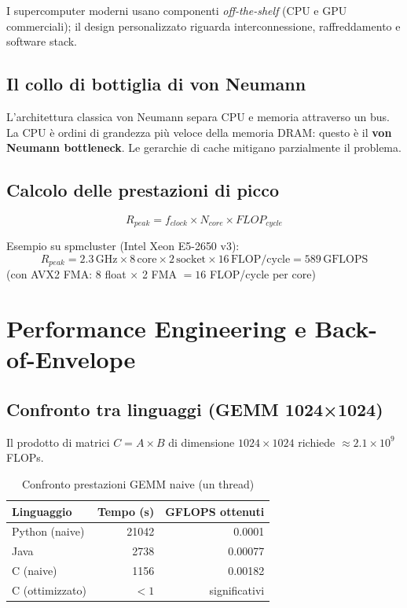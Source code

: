 \documentclass[11pt,a4paper]{article}
\theoremstyle{remark}
\begin{document}
I supercomputer moderni usano componenti \emph{off-the-shelf} (CPU e GPU commerciali); il design personalizzato riguarda interconnessione, raffreddamento e software stack.

\subsection{Il collo di bottiglia di von Neumann}

L'architettura classica von Neumann separa CPU e memoria attraverso un bus. La CPU è ordini di grandezza più veloce della memoria DRAM: questo è il \textbf{von Neumann bottleneck}. Le gerarchie di cache mitigano parzialmente il problema.

\subsection{Calcolo delle prestazioni di picco}

\begin{equation}
  R_{peak} = f_{clock} \times N_{core} \times FLOP_{cycle}
\end{equation}

Esempio su spmcluster (Intel Xeon E5-2650 v3):
\[
  R_{peak} = 2.3\,\text{GHz} \times 8\,\text{core} \times 2\,\text{socket} \times 16\,\text{FLOP/cycle} = 589\,\text{GFLOPS}
\]
(con AVX2 FMA: 8 float $\times$ 2 FMA $= 16$ FLOP/cycle per core)

\section{Performance Engineering e Back-of-Envelope}

\subsection{Confronto tra linguaggi (GEMM 1024×1024)}

Il prodotto di matrici $C = A \times B$ di dimensione $1024 \times 1024$ richiede $\approx 2.1 \times 10^9$ FLOPs.

\begin{table}[H]
\centering
\begin{tabular}{lrr}
\toprule
Linguaggio & Tempo (s) & GFLOPS ottenuti \\
\midrule
Python (naive) & 21042 & 0.0001 \\
Java & 2738 & 0.00077 \\
C (naive) & 1156 & 0.00182 \\
C (ottimizzato) & $< 1$ & significativi \\
\bottomrule
\end{tabular}
\caption{Confronto prestazioni GEMM naive (un thread)}
\end{table}
\end{document}
